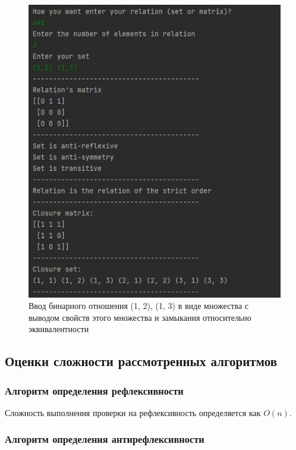 \documentclass[spec, och, labwork]{shiza}
\begin{document}
        \begin{figure}[H]
            \centering      %
            \includegraphics[width=1.\textwidth]{1}
            \caption{Ввод бинарного отношения {(1, 2), (1, 3)} в виде множества с выводом свойств этого множества и замыкания относительно эквивалентности}
            \label{fig:image1}
        \end{figure}

        \subsection{Оценки сложности рассмотренных алгоритмов}

        \subsubsection{Алгоритм определения рефлексивности}

            Сложность выполнения проверки на рефлексивность определяется как $O(n)$.
        
        \subsubsection{Алгоритм определения антирефлексивности}
\end{document}
